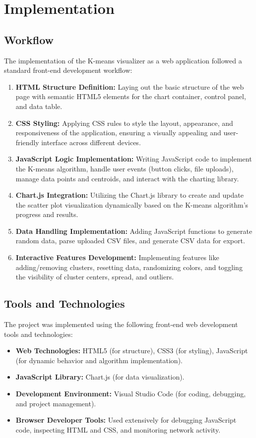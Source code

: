 \documentclass[12pt]{report}
\begin{document}
\section{Implementation}

\subsection{Workflow}
The implementation of the K-means visualizer as a web application followed a standard front-end development workflow:
\begin{enumerate}
    \item \textbf{HTML Structure Definition:} Laying out the basic structure of the web page with semantic HTML5 elements for the chart container, control panel, and data table.
    \item \textbf{CSS Styling:} Applying CSS rules to style the layout, appearance, and responsiveness of the application, ensuring a visually appealing and user-friendly interface across different devices.
    \item \textbf{JavaScript Logic Implementation:} Writing JavaScript code to implement the K-means algorithm, handle user events (button clicks, file uploads), manage data points and centroids, and interact with the charting library.
    \item \textbf{Chart.js Integration:} Utilizing the Chart.js library to create and update the scatter plot visualization dynamically based on the K-means algorithm's progress and results.
    \item \textbf{Data Handling Implementation:} Adding JavaScript functions to generate random data, parse uploaded CSV files, and generate CSV data for export.
    \item \textbf{Interactive Features Development:} Implementing features like adding/removing clusters, resetting data, randomizing colors, and toggling the visibility of cluster centers, spread, and outliers.
\end{enumerate}
\subsection{Tools and Technologies}
The project was implemented using the following front-end web development tools and technologies:
\begin{itemize}
    \item \textbf{Web Technologies:} HTML5 (for structure), CSS3 (for styling), JavaScript (for dynamic behavior and algorithm implementation).
    \item \textbf{JavaScript Library:} Chart.js (for data visualization).
    \item \textbf{Development Environment:} Visual Studio Code (for coding, debugging, and project management).
    \item \textbf{Browser Developer Tools:} Used extensively for debugging JavaScript code, inspecting HTML and CSS, and monitoring network activity.
\end{itemize}
\end{document}
